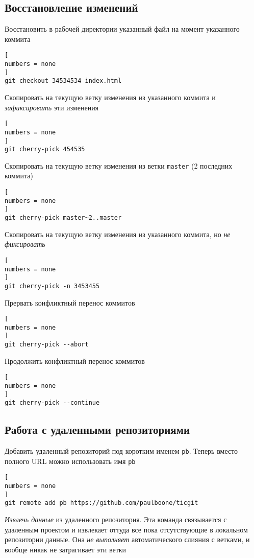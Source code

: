 \documentclass[%
	11pt,
	a4paper,
	utf8,
		]{article}
\begin{document}
\subsection{Восстановление изменений}

Восстановить в рабочей директории указанный файл на момент указанного коммита
\begin{lstlisting}[
numbers = none
]
git checkout 34534534 index.html
\end{lstlisting}

Скопировать на текущую ветку изменения из указанного коммита и \emph{зафиксировать} эти изменения
\begin{lstlisting}[
numbers = none
]
git cherry-pick 454535
\end{lstlisting}

Скопировать на текущую ветку изменения из ветки \texttt{master} (2 последних коммита)
\begin{lstlisting}[
numbers = none
]
git cherry-pick master~2..master
\end{lstlisting}

Скопировать на текущую ветку изменения из указанного коммита, но \emph{не фиксировать}
\begin{lstlisting}[
numbers = none
]
git cherry-pick -n 3453455
\end{lstlisting}

Прервать конфликтный перенос коммитов
\begin{lstlisting}[
numbers = none
]
git cherry-pick --abort
\end{lstlisting}

Продолжить конфликтный перенос коммитов
\begin{lstlisting}[
numbers = none
]
git cherry-pick --continue
\end{lstlisting}


\subsection{Работа с удаленными репозиториями}

Добавить удаленный репозиторий под коротким именем \texttt{pb}. Теперь вместо полного URL можно использовать имя \texttt{pb}

\begin{lstlisting}[
numbers = none
]
git remote add pb https://github.com/paulboone/ticgit
\end{lstlisting}


\emph{Извлечь данные} из удаленного репозитория. Эта команда связывается с удаленным проектом и извлекает оттуда все пока отсутствующие в локальном репозитории данные. Она \emph{\color{red}не выполняет} автоматического слияния с ветками, и вообще никак не затрагивает эти ветки
\end{document}
